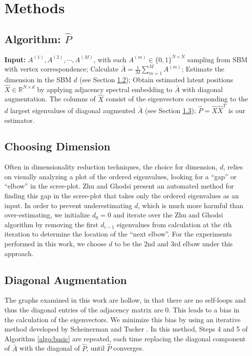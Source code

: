 
\section{Methods}

\subsection{Algorithm: $\hat{P}$}
\label{subsection:alg}
\begin{algorithm}[H]
\caption{}
\label{algo:basic}
\begin{algorithmic}[1]
\STATE \textbf{Input:} $A^{(1)}, A^{(2)}, \cdots, A^{(M)}$, with each $A^{(m)} \in \{0,1\}^{N \times N}$ sampling from SBM with vertex correspondence;
\STATE Calculate $\bar{A} = \frac{1}{M}\sum\limits_{m = 1}^M A^{(m)}$;
\STATE Estimate the dimension in the SBM $d$ (see Section \ref{subsection:choose_dim});
\STATE Obtain estimated latent positions $\hat{X} \in \mathbb{R}^{N \times d}$ by applying adjacency spectral embedding to $\bar{A}$ with diagonal augmentation. The columns of $\hat{X}$ consist of the eigenvectors corresponding to the $d$ largest eigenvalues of diagonal augmented $\bar{A}$ (see Section \ref{subsection:diag_aug});
\STATE $\hat{P} = \hat{X} \hat{X}^{T}$ is our estimator.
\end{algorithmic}
\end{algorithm}


\subsection{Choosing Dimension}
\label{subsection:choose_dim}
Often in dimensionality reduction techniques, the choice for dimension, $d$, relies on visually analyzing a plot of the ordered eigenvalues, looking for a ``gap'' or ``elbow'' in the scree-plot.  Zhu and Ghodsi \cite{zhu2006automatic} present an automated method for finding this gap in the scree-plot that takes only the ordered eigenvalues as an input.  In order to prevent underestimating $d$, which is much more harmful than over-estimating, we initialize $d_0 = 0$ and iterate over the Zhu and Ghodsi algorithm by removing the first $d_{i-1}$ eigenvalues from calculation at the $i$th iteration to determine the location of the ``next elbow''.  For the experiments performed in this work, we choose $d$ to be the 2nd and 3rd elbow under this approach.

	
\subsection{Diagonal Augmentation}
\label{subsection:diag_aug}
The graphs examined in this work are hollow, in that there are no self-loops and thus the diagonal entries of the adjacency matrix are 0.  This leads to a bias in the calculation of the eigenvectors.  We minimize this bias by using an iterative method developed by Scheinerman and Tucker \cite{scheinerman2010modeling}. In this method, Steps 4 and 5 of Algorithm \ref{algo:basic} are repeated, each time replacing the diagonal component of $\bar{A}$ with the diagonal of $\hat{P}$, until $\hat{P}$ converges.

